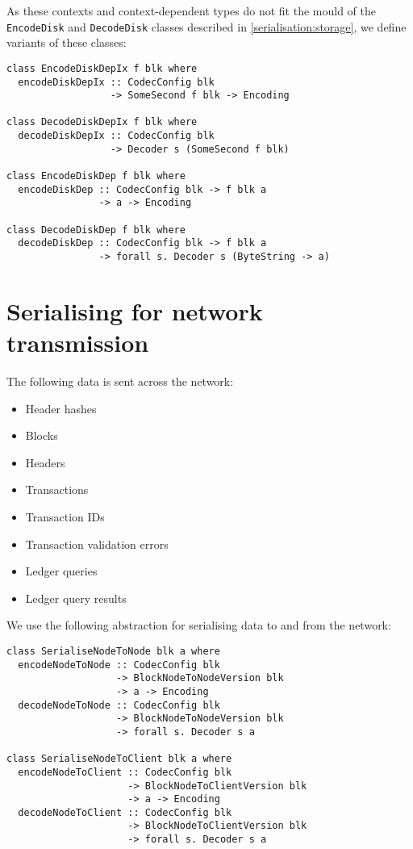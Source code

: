 As these contexts and context-dependent types do not fit the mould of the
\lstinline!EncodeDisk! and \lstinline!DecodeDisk! classes described in
\cref{serialisation:storage}, we define variants of these classes:
\begin{lstlisting}
class EncodeDiskDepIx f blk where
  encodeDiskDepIx :: CodecConfig blk
                  -> SomeSecond f blk -> Encoding

class DecodeDiskDepIx f blk where
  decodeDiskDepIx :: CodecConfig blk
                  -> Decoder s (SomeSecond f blk)

class EncodeDiskDep f blk where
  encodeDiskDep :: CodecConfig blk -> f blk a
                -> a -> Encoding

class DecodeDiskDep f blk where
  decodeDiskDep :: CodecConfig blk -> f blk a
                -> forall s. Decoder s (ByteString -> a)
\end{lstlisting}

\section{Serialising for network transmission}
\label{serialisation:network}

The following data is sent across the network:
\begin{itemize}
\item Header hashes
\item Blocks
\item Headers
\item Transactions
\item Transaction IDs
\item Transaction validation errors
\item Ledger queries
\item Ledger query results
\end{itemize}

We use the following abstraction for serialising data to and from the network:

\begin{lstlisting}
class SerialiseNodeToNode blk a where
  encodeNodeToNode :: CodecConfig blk
                   -> BlockNodeToNodeVersion blk
                   -> a -> Encoding
  decodeNodeToNode :: CodecConfig blk
                   -> BlockNodeToNodeVersion blk
                   -> forall s. Decoder s a

class SerialiseNodeToClient blk a where
  encodeNodeToClient :: CodecConfig blk
                     -> BlockNodeToClientVersion blk
                     -> a -> Encoding
  decodeNodeToClient :: CodecConfig blk
                     -> BlockNodeToClientVersion blk
                     -> forall s. Decoder s a
\end{lstlisting}

